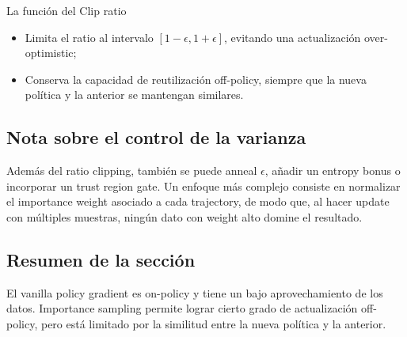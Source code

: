 \begin{importantbox}{La función del Clip ratio}
\begin{itemize}
    \item Limita el ratio al intervalo $[1-\epsilon,1+\epsilon]$, evitando una actualización over-optimistic;
    \item Conserva la capacidad de reutilización off-policy, siempre que la nueva política y la anterior se mantengan similares.
\end{itemize}
\end{importantbox}

\subsection{Nota sobre el control de la varianza}
Además del ratio clipping, también se puede anneal $\epsilon$, añadir un entropy bonus o incorporar un trust region gate. Un enfoque más complejo consiste en normalizar el importance weight asociado a cada trajectory, de modo que, al hacer update con múltiples muestras, ningún dato con weight alto domine el resultado.

\subsection{Resumen de la sección}

El vanilla policy gradient es on-policy y tiene un bajo aprovechamiento de los datos. Importance sampling permite lograr cierto grado de actualización off-policy, pero está limitado por la similitud entre la nueva política y la anterior.
